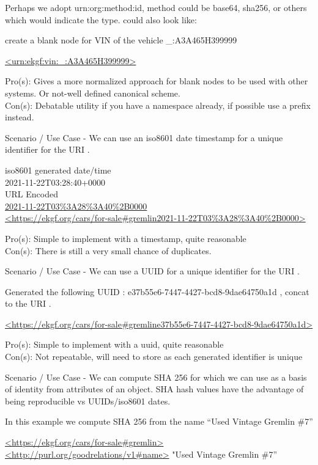 Perhaps we adopt urn:org:method:id, method could be base64, sha256, or others which would indicate the type.
could also look like:

create a blank node for VIN of the vehicle
    {\footnotesize \_:A3A465H399999}

    {\footnotesize\url{<urn:ekgf:vin:_:A3A465H399999>}}

Pro(s): Gives a more normalized approach for blank nodes to be used with other systems.
Or not-well defined canonical scheme. \\
Con(s): Debatable utility if you have a namespace already, if possible use a prefix instead.

Scenario / Use Case -
We can use an iso8601 date timestamp for a unique identifier for the URI .

iso8601 generated date/time \\
2021-11-22T03:28:40+0000 \\
URL Encoded \\
{\url {2021-11-22T03%3A28%3A40%2B0000}} \\
    {\footnotesize\url{<https://ekgf.org/cars/for-sale#gremlin2021-11-22T03%3A28%3A40%2B0000>}}

Pro(s): Simple to implement with a timestamp, quite reasonable \\
Con(s): There is still a very small chance of duplicates.

Scenario / Use Case -
We can use a UUID for a unique identifier for the URI .

Generated the following UUID :
    {\footnotesize e37b55e6-7447-4427-bcd8-9dae64750a1d }, concat to the URI .

    {\footnotesize\url{<https://ekgf.org/cars/for-sale#gremline37b55e6-7447-4427-bcd8-9dae64750a1d>}}

Pro(s): Simple to implement with a uuid, quite reasonable \\
Con(s): Not repeatable, will need to store as each generated identifier is unique

Scenario / Use Case -
We can compute SHA 256 for which we can use as a basis of identity from attributes of an object.
SHA hash values have the advantage of being reproducible vs UUIDs/iso8601 dates.

In this example we compute SHA 256 from the name “Used Vintage Gremlin \#7”

    {\footnotesize\url{<https://ekgf.org/cars/for-sale#gremlin>} \\ \url{<http://purl.org/goodrelations/v1#name>} "Used Vintage Gremlin \#7”}

